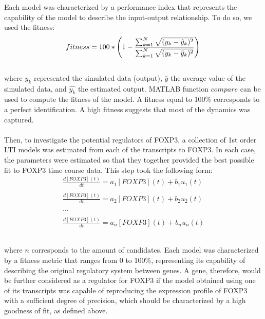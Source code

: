 \documentclass[oneside, 10pt, a4paper, twocolumn]{article}
\begin{document}
{Each model was characterized by a performance index that represents the capability of the model to describe the input-output relationship. To do so, we used the fitness:
\begin{equation}
fitness = 100 * \left(1 - \frac{\sum_{k=1}^{N} \sqrt{(y_k - \hat{y}_k)^2}}{\sum_{k=1}^{N} \sqrt{(y_k - \bar{y}_k)^2}}\right) \\
\label{fitness}
\end{equation}\\
where $y_k$ represented the simulated data (output), $\bar{y}$ the average value of the simulated data, and $\hat{y_k}$ the estimated output. MATLAB function $compare$ can be used to compute the fitness of the model. A fitness equal to 100\% corresponds to a perfect identification. A high fitness suggests that most of the dynamics was captured. \\ \\
Then, to investigate the potential regulators of FOXP3, a collection of 1st order LTI models was estimated from each of the transcripts to FOXP3. In each case, the parameters were estimated so that they together provided the best possible fit to FOXP3 time course data. This step took the following form:\\
\begin{equation}
\begin{array}{l}
\frac{d[FOXP3](t)}{dt} = a_1 [FOXP3](t) + b_1 u_1(t) \\ \\
\frac{d[FOXP3](t)}{dt} = a_2 [FOXP3](t) + b_2 u_2(t) \\ \\
... \\ \\
\frac{d[FOXP3](t)}{dt} = a_n [FOXP3](t) + b_n u_n(t) \\ \\
\end{array}
\label{All-2-oneEq}
\end{equation}\\
where $n$ corresponds to the amount of candidates. Each model was characterized by a fitness metric that ranges from 0 to 100\%, representing its capability of describing the original regulatory system between genes. A gene, therefore, would be further considered as a regulator for FOXP3 if the model obtained using one of its transcripts was capable of reproducing the expression profile of FOXP3 with a sufficient degree of precision, which should be characterized by a high goodness of fit, as defined above. \\ \\
}
\end{document}
